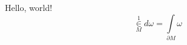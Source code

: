 \documentclass[a4paper, 12pt]{article}
\begin{document}
    Hello, world!
    $$
        \in\limits_{M}^1 d\omega = \int\limits_{\partial M} \omega
    $$
\end{document}
